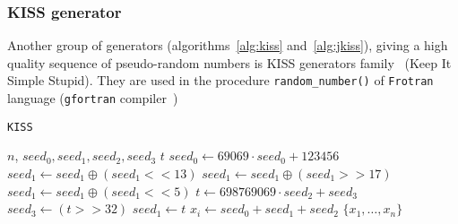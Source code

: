 \documentclass[%
floatfix,
showkeys,
nofootinbib, %
superscriptaddress, %
]{revtex4-1}
\begin{document}
\subsubsection{KISS generator}
Another group of generators (algorithms~\ref{alg:kiss}
and~\ref{alg:jkiss}), giving a high quality sequence of pseudo-random
numbers is KISS generators family~\cite{L_KISS:2011} (Keep It Simple
Stupid). They are used in the procedure \texttt{random\_number()} of
\texttt{Frotran} language (\texttt{gfortran}
compiler~\cite{L_gfortran:2015})

\begin{minipage}[t]{0.5\textwidth}
        \vspace{-10pt}
        \begin{algorithm}[H]
                \begin{algorithmic}
                        \caption{\texttt{KISS}}\label{alg:kiss}
                        \Require $n$, $seed_{0},seed_{1},seed_{2},seed_{3}$
                        \State $t$
                                \State $seed_{0} \leftarrow 69069 \cdot seed_{0} + 123456$
                                \State $seed_{1} \leftarrow seed_{1} \oplus (seed_{1} << 13)$
                                \State $seed_{1} \leftarrow seed_{1} \oplus (seed_{1} >> 17)$
                                \State $seed_{1} \leftarrow seed_{1} \oplus (seed_{1} << 5)$
                                \State $t \leftarrow 698769069 \cdot seed_{2} + seed_{3}$
                                \State $seed_{3} \leftarrow (t >> 32)$
                                \State $seed_{1} \leftarrow t$
                                \State $x_{i} \leftarrow seed_{0} + seed_{1} + seed_{2}$
                        \EndFor
                        \State \Return $\{x_{1},\ldots,x_{n}\}$
                \end{algorithmic}
        \end{algorithm}
\end{minipage}
\end{document}
